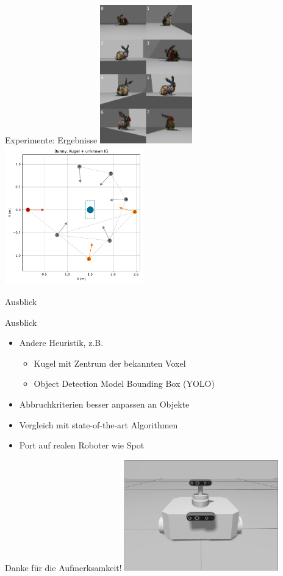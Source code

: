 \documentclass[aspectratio=169]{beamer}
\begin{document}
\begin{frame}{Experimente: Ergebnisse}
	\centering
	\includegraphics[width=0.3\textwidth]{Graphics/bunny_unknown_0_collage.jpg}
	\includegraphics[width=0.45\textwidth]{Graphics/bunny_sphere_unknown_views.pdf}
\end{frame}

\begin{frame}{Ausblick}
	\begin{block}{Ausblick}
		\begin{itemize}
			\item Andere Heuristik, z.B. \begin{itemize}
				      \item Kugel mit Zentrum der bekannten Voxel
				      \item Object Detection Model Bounding Box (YOLO)
			      \end{itemize}
			\item Abbruchkriterien besser anpassen an Objekte
			\item Vergleich mit state-of-the-art Algorithmen
			\item Port auf realen Roboter wie Spot
		\end{itemize}
	\end{block}

\end{frame}

\begin{frame}{}
	\centering
	\Large{Danke für die Aufmerksamkeit!}
	\vfill
	\includegraphics[width=0.5\textwidth]{Graphics/tb.png}
\end{frame}

\printbibliography
\end{document}
